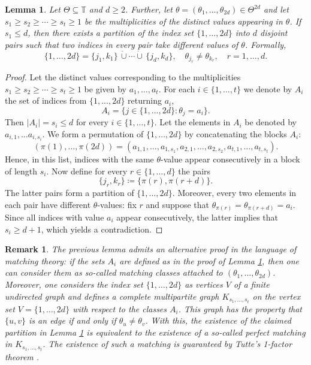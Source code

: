 \documentclass[reqno,a4paper,11pt]{amsart}
\numberwithin{equation}{section}
\newtheorem{lemma}[definition]{Lemma}
\newtheorem{remark}[definition]{Remark}
\def\T{{\mathbb T}}
\newcommand\1{\mathds{1}}
\begin{document}
\begin{lemma}\label{lma:graph_theoretical}
    Let $\Theta\subseteq \T$ and $d\geq 2$. Further, let $\theta = (\theta_1, \dots, \theta_{2d}) \in \Theta^{2d}$ and let $s_1 \geq s_2 \geq \cdots \geq s_t \geq 1$ be the multiplicities of the distinct values appearing in $\theta$. If $s_1 \leq d$, then there exists a partition of the index set $\{ 1,\dots, 2d \}$ into $d$ disjoint pairs such that two indices in every pair take different values of $\theta$. Formally, 
    $$
    \{ 1,\dots, 2d \} = \{ j_1, k_1 \} \, \dot{\cup} \cdots \dot{\cup} \, \{ j_d, k_d \}, \quad \theta_{j_r} \neq \theta_{k_r}, \quad r = 1, \dots, d.
    $$
\end{lemma}
\begin{proof}
    Let the distinct values corresponding to the multiplicities $s_1 \geq s_2 \geq \cdots \geq s_t \geq 1$ be given by $a_1, \dots, a_t$. For each $i\in \{1,...,t\}$ we denote by $A_i$ the set of indices from $\{1,...,2d\}$ returning $a_i$,
    $$
    A_i = \{ j \in \{ 1, \dots, 2d \} : \theta_j = a_i \}.
    $$
    Then $|A_i|=s_i \leq d$ for every $i \in \{ 1, \dots, t \}$. Let the elements in $A_i$ be denoted by $a_{i,1}, \dots a_{i,s_i}$. We form a permutation of $\{ 1, \dots, 2d \}$ by concatenating the blocks $A_i$:
    $$
    \left ( \pi(1), \dots, \pi(2d) \right ) = (a_{1,1}, \dots, a_{1,s_1}, a_{2,1}, \dots, a_{2,s_2}, a_{t,1}, \dots, a_{t,s_t}).
    $$
    Hence, in this list, indices with the same $\theta$-value appear consecutively in a block of length $s_i$. Now define for every $r \in \{ 1,\dots, d \}$ the pairs
    $$
    \{ j_r,k_r\} \coloneqq \{ \pi(r), \pi(r+d) \}.
    $$
    The latter pairs form a partition of $\{ 1, \dots, 2d \}$. Moreover, every two elements in each pair have different $\theta$-values: fix $r$ and suppose that $\theta_{\pi(r)} = \theta_{\pi(r+d)} = a_i$. Since all indices with value $a_i$ appear consecutively, the latter implies that $s_i \geq d+1$, which yields a contradiction.
\end{proof}

\begin{remark}
    The previous lemma admits an alternative proof in the language of matching theory: if the sets $A_i$ are defined as in the proof of Lemma \ref{lma:graph_theoretical}, then one can consider them as so-called matching classes attached to $(\theta_1, \dots, \theta_{2d})$. Moreover, one considers the index set $\{ 1, \dots, 2d \}$ as vertices $V$ of a finite undirected graph and defines a complete multipartite graph $K_{s_1,\dots,s_t}$ on the vertex set $V = \{ 1, \dots, 2d \}$ with respect to the classes $A_i$. This graph has the property that $\{u,v \}$ is an edge if and only if $\theta_{u} \neq \theta_{v}$. With this, the existence of the claimed partition in Lemma \ref{lma:graph_theoretical} is equivalent to the existence of a so-called perfect matching in $K_{s_1,\dots,s_t}$. The existence of such a matching is guaranteed by Tutte's 1-factor theorem \cite{lovasz2009matching,plummer1992matching}.
\end{remark}
\end{document}
